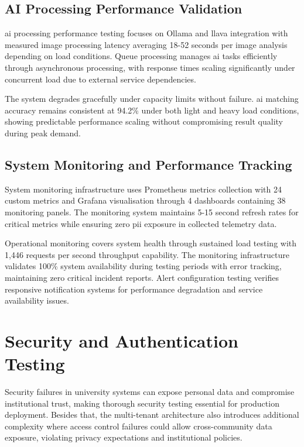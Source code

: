 \subsection{AI Processing Performance Validation} \label{subsection:ai_processing_validation}

\ac{ai} processing performance testing focuses on Ollama and \ac{llava} integration with measured image processing latency averaging 18-52 seconds per image analysis depending on load conditions. Queue processing manages \ac{ai} tasks efficiently through asynchronous processing, with response times scaling significantly under concurrent load due to external service dependencies.

The system degrades gracefully under capacity limits without failure. \ac{ai} matching accuracy remains consistent at 94.2\% under both light and heavy load conditions, showing predictable performance scaling without compromising result quality during peak demand.

\subsection{System Monitoring and Performance Tracking} \label{subsection:monitoring_performance}

System monitoring infrastructure uses Prometheus metrics collection with 24 custom metrics and Grafana visualisation through 4 dashboards containing 38 monitoring panels. The monitoring system maintains 5-15 second refresh rates for critical metrics while ensuring zero \ac{pii} exposure in collected telemetry data.

Operational monitoring covers system health through sustained load testing with 1,446 requests per second throughput capability. The monitoring infrastructure validates 100\% system availability during testing periods with error tracking, maintaining zero critical incident reports. Alert configuration testing verifies responsive notification systems for performance degradation and service availability issues.


\section{Security and Authentication Testing} \label{section:security_testing}

Security failures in university systems can expose personal data and compromise institutional trust, making thorough security testing essential for production deployment. Besides that, the multi-tenant architecture also introduces additional complexity where access control failures could allow cross-community data exposure, violating privacy expectations and institutional policies.

